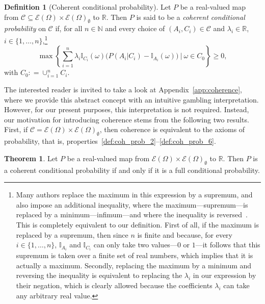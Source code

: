 \documentclass[10pt,a4paper]{paper}
\theoremstyle{definition}
\newtheorem{theorem}{Theorem}[section]
\newtheorem{definition}{Definition}
\newcommand{\reals}{\mathbb{R}}
\newcommand{\paths}{\Omega}
\newcommand{\power}{\mathcal{E}(\paths)}
\newcommand{\nonemptypower}{\power_{\emptyset}}
\newcommand{\ind}[1]{\mathbb{I}_{#1}}
\newcommand{\coloneqq}{:\!=}
\begin{document}
\begin{definition}[Coherent conditional probability]\label{def:coherence}
Let $P$ be a real-valued map from $\mathcal{C}\subseteq\power\times\nonemptypower$ to $\reals$. Then $P$ is said to be a \emph{coherent conditional probability} on $\mathcal{C}$ if, for all $n\in\mathbb{N}$ and every choice of $(A_i,C_i)\in\mathcal{C}$ and $\lambda_i\in\reals$, $i\in\{1,\dots,n\}$,\footnote{Many authors replace the maximum in this expression by a supremum, and also impose an additional inequality, where the maximum---supremum---is replaced by a minimum---infimum---and where the inequality is reversed~\cite{berti2002coherent,berti1991coherent,regazzini1985finitely}. This is completely equivalent to our definition. First of all, if the maximum is replaced by a supremum, then since $n$ is finite and because, for every $i\in\{1,\dots,n\}$, $\ind{A_i}$ and $\ind{C_i}$ can only take two values---$0$ or $1$---it follows that this supremum is taken over a finite set of real numbers, which implies that it is actually a maximum. Secondly, replacing the maximum by a minimum and reversing the inequality is equivalent to replacing the $\lambda_i$ in our expression by their negation, which is clearly allowed because the coefficients $\lambda_i$ can take any arbitrary real value.}
\begin{equation*}
\max\left\{\sum_{i=1}^n\lambda_i\ind{C_i}(\omega)\bigl(P(A_i\vert C_i)-\ind{A_i}(\omega)\bigr)~\Bigg\vert~\omega\in C_0\right\}\geq0,
\end{equation*}
with $C_0\coloneqq\cup_{i=1}^nC_i$.
\end{definition}
The interested reader is invited to take a look at Appendix~\ref{app:coherence}, where we provide this abstract concept with an intuitive gambling interpretation. However, for our present purposes, this interpretation is not required. Instead, our motivation for introducing coherence stems from the following two results. First, if $\mathcal{C}=\power\times\nonemptypower$, then coherence is equivalent to the axioms of probability, that is, properties~\ref{def:coh_prob_2}--\ref{def:coh_prob_6}.%
\begin{theorem}{\cite[Theorem 3]{regazzini1985finitely}}\label{theo:fullcoherent}
Let $P$ be a real-valued map from $\power\times\nonemptypower$ to $\reals$. Then $P$ is a coherent conditional probability if and only if it is a full conditional probability.
\end{theorem}
\end{document}
